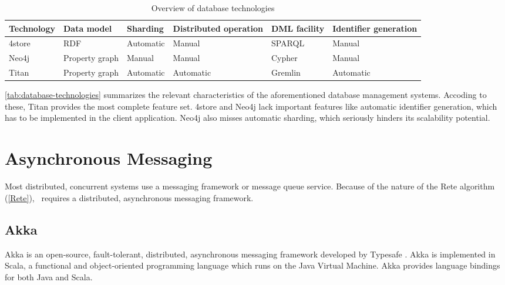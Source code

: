 
\begin{table}[htb]

\centering
\begin{tabular}{ | l | l | l | m{2cm} | l | m{2cm} | }

\hline
\bf Technology & 
\bf Data model & 
\bf Sharding & 
\bf Distributed operation & 
\bf DML facility & 
\bf Identifier generation \tabularnewline \hline\hline
4store     & RDF            & Automatic & Manual                & SPARQL       & Manual                \\ \hline
Neo4j      & Property graph & Manual    & Manual                & Cypher       & Manual                \\ \hline
Titan      & Property graph & Automatic & Automatic             & Gremlin      & Automatic             \\ \hline

\end{tabular}
\caption{Overview of database technologies}
\label{tab:database-technologies}

\end{table}

\autoref{tab:database-technologies} summarizes the relevant characteristics of the aforementioned database management systems. Accoding to these, Titan provides the most complete feature set. 4store and Neo4j lack important features like automatic identifier generation, which has to be implemented in the client application. Neo4j also misses automatic sharding, which seriously hinders its scalability potential. 

\section{Asynchronous Messaging}

Most distributed, concurrent systems use a messaging framework or message queue service. Because of the nature of the Rete algorithm (\autoref{Rete}), \iqd{}\ requires a distributed, asynchronous messaging framework.

\subsection{Akka}
\label{subsec:akka}

Akka is an open-source, fault-tolerant, distributed, asynchronous messaging framework developed by Typesafe \cite{Akka}.
Akka is implemented in Scala, a functional and object-oriented programming language which runs on the Java Virtual Machine. Akka provides language bindings for both Java and Scala.

